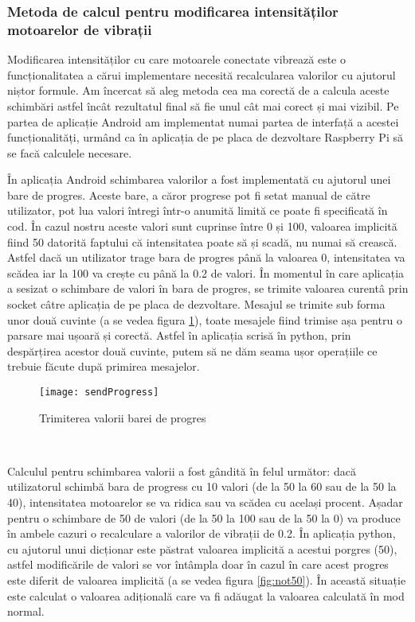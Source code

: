 \documentclass[../IoMusT.tex]{subfiles}
\begin{document}
\subsubsection{Metoda de calcul pentru modificarea intensităților motoarelor de vibrații}
Modificarea intensităților cu care motoarele conectate vibrează este o funcționalitatea a cărui implementare necesită recalcularea valorilor cu ajutorul niștor formule. Am încercat să aleg metoda cea ma corectă de a calcula aceste schimbări astfel încât rezultatul final să fie unul cât mai corect și mai vizibil. Pe partea de aplicație Android am implementat numai partea de interfață a acestei funcționalități, urmând ca în aplicația de pe placa de dezvoltare Raspberry Pi să se facă calculele necesare.
\\ %
\par În aplicația Android schimbarea valorilor a fost implementată cu ajutorul unei bare de progres. Aceste bare, a căror progrese pot fi setat manual de către utilizator, pot lua valori întregi într-o anumită limită ce poate fi spe\-ci\-fi\-ca\-tă în cod. În cazul nostru aceste valori sunt cuprinse între 0 și 100, valoarea implicită fiind 50 datorită faptului că intensitatea poate să și scadă, nu numai să crească. Astfel dacă un utilizator trage bara de progres până la valoarea 0, intensitatea va scădea iar la 100 va crește cu până la 0.2 de valori. În momentul în care aplicația a sesizat o schimbare de valori în bara de progres, se trimite valoarea curentâ prin socket câtre aplicația de pe placa de dezvoltare. Mesajul se trimite sub forma unor două cuvinte (a se vedea figura \ref{fig:sendProgress}), toate mesajele fiind trimise așa pentru o parsare mai ușoară și corectă. Astfel în aplicația scrisă în python, prin despărțirea acestor două cuvinte, putem să ne dăm seama ușor operațiile ce trebuie făcute după pri\-mi\-rea mesajelor.
\begin{figure}[h]
\centering
\texttt{[image: sendProgress]}
\caption{Trimiterea valorii barei de progres}
\label{fig:sendProgress}
\end{figure} 
\\
\par Calculul pentru schimbarea valorii a fost gândită în felul următor: dacă utilizatorul schimbă bara de progress cu 10 valori (de la 50 la 60 sau de la 50 la 40), intensitatea motoarelor se va ridica sau va scădea cu același procent. Așadar pentru o schimbare de 50 de valori (de la 50 la 100 sau de la 50 la 0) va produce în ambele cazuri o recalculare a valorilor de vibrații de 0.2. În aplicația python, cu ajutorul unui dicționar este păstrat valoarea implicită a acestui porgres (50), astfel modificările de valori se vor întâmpla doar în cazul în care acest progres este diferit de valoarea implicită (a se vedea figura \ref{fig:not50}). În această situație este calculat o valoarea adițională care va fi adăugat la valoarea calculată în mod normal.
\end{document}
